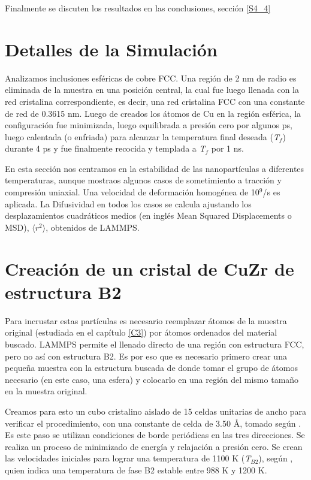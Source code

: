 Finalmente se discuten los resultados en las conclusiones, sección \ref{S4_4}


\section{Detalles de la Simulación}
\label{S4_1}

Analizamos inclusiones esféricas de cobre FCC. Una región de 2 nm de radio es eliminada de la muestra en una posición central, la cual fue luego llenada con la red cristalina correspondiente, es decir, una red cristalina FCC con una constante de red de 0.3615 nm. Luego de creados los átomos de Cu en la región esférica, la configuración fue minimizada, luego equilibrada a presión cero por algunos ps, luego calentada (o enfriada) para alcanzar la temperatura final deseada (\textit{T$_{f}$}) durante 4 ps y fue finalmente recocida y templada a \textit{T$_{f}$} por 1 ns.

En esta sección nos centramos en la estabilidad de las nanopartículas a diferentes temperaturas, aunque mostraos algunos casos de sometimiento a tracción y compresión uniaxial. Una velocidad de deformación homogénea de 10$^{9}$/s es aplicada. La Difusividad en todos los casos se calcula ajustando los desplazamientos cuadráticos medios (en inglés Mean Squared Displacements o MSD), $\langle r^{2}\rangle$, obtenidos de LAMMPS.

\section{Creación de un cristal de CuZr de estructura B2}
\label{S4_2}

Para incrustar estas partículas es necesario reemplazar átomos de la muestra original (estudiada en el capítulo \ref{C3}) por átomos ordenados del material buscado. LAMMPS permite el llenado directo de una región con estructura FCC, pero no así con estructura B2. Es por eso que es necesario  primero crear una pequeña muestra con la estructura buscada de donde tomar el grupo de átomos necesario (en este caso, una esfera) y colocarlo en una región del mismo tamaño en la muestra original.

Creamos para esto un cubo cristalino aislado de 15 celdas unitarias de ancho para verificar el procedimiento, con una constante de celda de 3.50 \AA{}, tomado según \cite{inoue04}. Es este paso se utilizan condiciones de borde periódicas en las tres direcciones. Se realiza un proceso de minimizado de energía y relajación a presión cero. Se crean las velocidades iniciales para lograr una temperatura de 1100 K (\textit{T$_{B2}$}), según \cite{pauly10}, quien indica una temperatura de fase B2 estable entre 988 K y 1200 K. 

